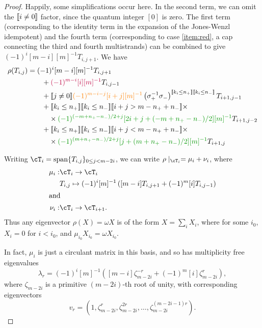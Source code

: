 \documentclass[12pt]{article}
\begin{document}
\begin{proof}
Happily, some simplifications occur here. In the second term, we can omit the $[\![ i\neq0 ]\!]$ factor, since the quantum integer $[0]$ is zero. The first term (corresponding to the identity term in the expansion of the Jones-Wenzl idempotent) and the fourth term (corresponding to case \eqref{item:red}, a cap connecting the third and fourth multistrands) can be combined to give $(-1)^i [m-i][m]^{-1} T_{i,j+1}$. We have
\begin{align*}
\rho(T_{i,j}) & =
(-1)^i[m-i][m]^{-1} T_{i, j + 1} \\
& \qquad +
\textcolor{purple}{(-1)^{m-i} [i][m]^{-1}} T_{i,j-1} \\
& \qquad +
\truth{j \neq 0}\textcolor{orange}{(-1)^{m-i-j} [i+j][m]^{-1}} \left(\sigma_+^{-1} \sigma_-\right)^{\truth{k_i \leq n_+} \truth{k_i \leq n_-}} T_{i+1, j-1} \\
& \qquad +
\truth{k_i \leq n_+} \truth{k_i \leq n_-}
\truth{i+j > m - n_+ + n_-} \times \\
& \qquad \quad \times \textcolor{DarkGreen}{(-1)^{(-m + n_+ - n_-)/2 + j} [2i + j + (-m + n_+ - n_-)/2][m]^{-1}} T_{i+1,j-2} \\
& \qquad +
\truth{k_i \leq n_+} \truth{k_i \leq n_-}
\truth{i+j < m - n_+ + n_-} \times \\
& \qquad \quad \times \textcolor{DarkGreen}{(-1)^{(m + n_+ - n_-)/2 + j} [j+ (m + n_+ - n_-)/2 ][m]^{-1}} T_{i+1,j}
\end{align*}


Writing $\cT_i = \Span \{ T_{i,j} \}_{0 \leq j < m- 2i}$, we can write $\rho \mid_{\cT_i} = \mu_i + \nu_i$, where
\begin{align*}
\mu_i : & \cT_i \to \cT_i \\
 & T_{i,j} \mapsto (-1)^i [m]^{-1} \left( [m-i] T_{i,j+1} + (-1)^{m}[i] T_{i,j-1}\right) \\
\intertext{and}
\nu_i : & \cT_i \to \cT_{i+1}.
\end{align*}
Thus any eigenvector $\rho(X) = \omega X$ is of the form $X = \sum_i X_i$, where for some $i_0$, $X_i = 0$ for $i < i_0$, and $\mu_{i_0} X_{i_0} = \omega X_{i_0}$.

In fact, $\mu_i$ is just a circulant matrix in this basis, and so has multiplicity free eigenvalues
$$\lambda_r = (-1)^i[m]^{-1} \left([m-i] \zeta_{m-2i}^{-r} + (-1)^{m}[i] \zeta_{m-2i}^r\right),$$
where $\zeta_{m-2i}$ is a primitive $(m-2i)$-th root of unity, with corresponding eigenvectors
$$v_r = \left(1, \zeta_{m-2i}^r , \zeta_{m-2i}^{2r} , \ldots, \zeta_{m-2i}^{(m-2i-1)r} \right).$$


\end{proof}
\end{document}

